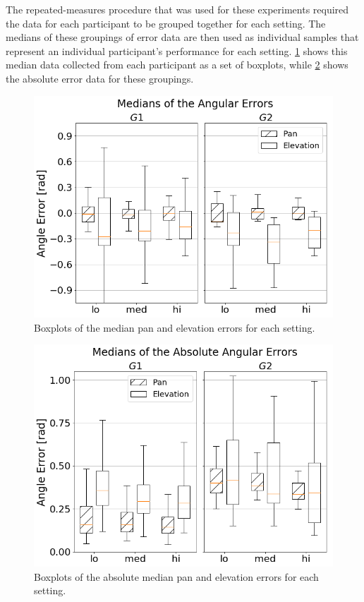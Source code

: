 \documentclass{article}
\begin{document}
The repeated-measures procedure that was used for these experiments required the data for each participant to be grouped together for each setting.
The medians of these groupings of error data are then used as individual samples that represent an individual participant's performance for each setting.
\cref{fig:target-boxplot-error} shows this median data collected from each participant as a set of boxplots, while \cref{fig:target-boxplot-absolute-error} shows the absolute error data for these groupings. 

\begin{figure}
  \centering
  \includegraphics[width=1.0\textwidth]{figures/boxplot_target_search_median_error.png}
  \caption{Boxplots of the median pan and elevation errors for each setting. }\label{fig:target-boxplot-error}
\end{figure}

\begin{figure}
  \centering
  \includegraphics[width=1.0\textwidth]{figures/boxplot_target_search_absolute_median_error.png}
  \caption{Boxplots of the absolute median pan and elevation errors for each setting. }\label{fig:target-boxplot-absolute-error}
\end{figure}
\end{document}
